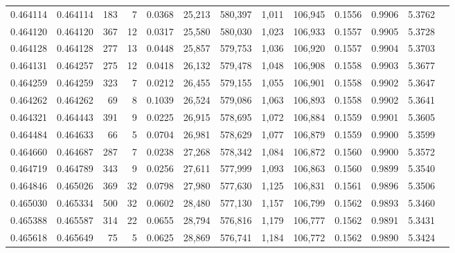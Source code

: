 \begin{tabular}{rrrrrrrrrrrrr}
0.464114 & 0.464114 &   183 &     7 &                                     0.0368 &  25,213 & 580,397 &   1,011 & 106,945 & 0.1556 & 0.9906 & 5.3762 \\
0.464120 & 0.464120 &   367 &    12 &                                     0.0317 &  25,580 & 580,030 &   1,023 & 106,933 & 0.1557 & 0.9905 & 5.3728 \\
0.464128 & 0.464128 &   277 &    13 &                                     0.0448 &  25,857 & 579,753 &   1,036 & 106,920 & 0.1557 & 0.9904 & 5.3703 \\
0.464131 & 0.464257 &   275 &    12 &                                     0.0418 &  26,132 & 579,478 &   1,048 & 106,908 & 0.1558 & 0.9903 & 5.3677 \\
0.464259 & 0.464259 &   323 &     7 &                                     0.0212 &  26,455 & 579,155 &   1,055 & 106,901 & 0.1558 & 0.9902 & 5.3647 \\
0.464262 & 0.464262 &    69 &     8 &                                     0.1039 &  26,524 & 579,086 &   1,063 & 106,893 & 0.1558 & 0.9902 & 5.3641 \\
0.464321 & 0.464443 &   391 &     9 &                                     0.0225 &  26,915 & 578,695 &   1,072 & 106,884 & 0.1559 & 0.9901 & 5.3605 \\
0.464484 & 0.464633 &    66 &     5 &                                     0.0704 &  26,981 & 578,629 &   1,077 & 106,879 & 0.1559 & 0.9900 & 5.3599 \\
0.464660 & 0.464687 &   287 &     7 &                                     0.0238 &  27,268 & 578,342 &   1,084 & 106,872 & 0.1560 & 0.9900 & 5.3572 \\
0.464719 & 0.464789 &   343 &     9 &                                     0.0256 &  27,611 & 577,999 &   1,093 & 106,863 & 0.1560 & 0.9899 & 5.3540 \\
0.464846 & 0.465026 &   369 &    32 &                                     0.0798 &  27,980 & 577,630 &   1,125 & 106,831 & 0.1561 & 0.9896 & 5.3506 \\
0.465030 & 0.465334 &   500 &    32 &                                     0.0602 &  28,480 & 577,130 &   1,157 & 106,799 & 0.1562 & 0.9893 & 5.3460 \\
0.465388 & 0.465587 &   314 &    22 &                                     0.0655 &  28,794 & 576,816 &   1,179 & 106,777 & 0.1562 & 0.9891 & 5.3431 \\
0.465618 & 0.465649 &    75 &     5 &                                     0.0625 &  28,869 & 576,741 &   1,184 & 106,772 & 0.1562 & 0.9890 & 5.3424 \\

\end{tabular}
